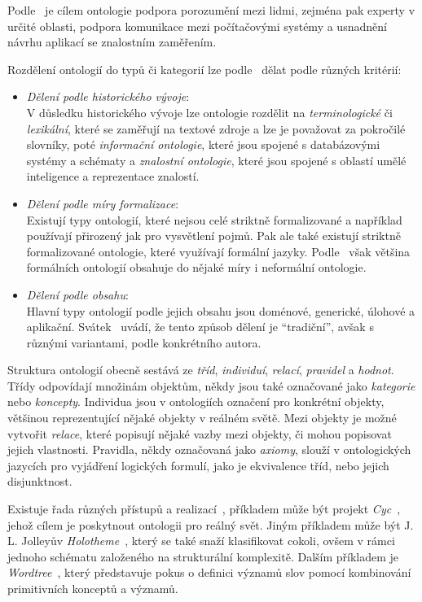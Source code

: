 Podle~\cite{onto_svatek} je cílem ontologie podpora porozumění mezi lidmi, zejména pak experty v určité oblasti,
podpora komunikace mezi počítačovými systémy a usnadnění návrhu aplikací se znalostním zaměřením.

Rozdělení ontologií do typů či kategorií lze podle~\cite{onto_svatek} dělat podle různých kritérií:
\begin{itemize}
	\item \emph{Dělení podle historického vývoje}:\\
	      V důsledku historického vývoje lze ontologie rozdělit na \emph{terminologické} či \emph{lexikální}, které se zaměřují
	      na textové zdroje a lze je považovat za pokročilé slovníky, poté \emph{informační ontologie}, které jsou spojené s databázovými systémy a schématy
	      a \emph{znalostní ontologie}, které jsou spojené s oblastí umělé inteligence a reprezentace znalostí.
	\item \emph{Dělení podle míry formalizace}:\\
	      Existují typy ontologií, které nejsou celé striktně formalizované a například používají přirozený jak pro vysvětlení pojmů.
	      Pak ale také existují striktně formalizované ontologie, které využívají formální jazyky.
	      Podle~\cite{onto_svatek} však většina formálních ontologií obsahuje do nějaké míry i neformální ontologie.
	\item \emph{Dělení podle obsahu}:\\
	      Hlavní typy ontologií podle jejich obsahu jsou doménové, generické, úlohové a aplikační.
	      Svátek~\cite{onto_svatek} uvádí, že tento způsob dělení je \enquote{tradiční}, avšak s různými variantami, podle konkrétního autora.
\end{itemize}

Struktura ontologií obecně sestává ze \emph{tříd}, \emph{individuí}, \emph{relací}, \emph{pravidel} a \emph{hodnot}.
Třídy odpovídají množinám objektům, někdy jsou také označované jako \emph{kategorie} nebo \emph{koncepty}.
Individua jsou v ontologiích označení pro konkrétní objekty, většinou reprezentující nějaké objekty v reálném světě.
Mezi objekty je možné vytvořit \emph{relace}, které popisují nějaké vazby mezi objekty, či mohou popisovat jejich vlastnosti.
Pravidla, někdy označovaná jako \emph{axiomy}, slouží v ontologických jazycích pro vyjádření logických formulí, jako je ekvivalence tříd, nebo jejich disjunktnost.~\cite{onto_svatek}

Existuje řada různých přístupů a realizací~\cite{semantic-nets-LEHMANN19921}, příkladem může být projekt \emph{Cyc}~\cite{cyc}, jehož cílem je poskytnout ontologii pro reálný svět.
Jiným příkladem může být J. L. Jolleyův \emph{Holotheme}~\cite{jolley1971holotheme}, který se také snaží klasifikovat cokoli,
ovšem v rámci jednoho schématu založeného na strukturální komplexitě.
Dalším příkladem je \emph{Wordtree}~\cite{burger1984wordtree}, který představuje pokus o definici významů slov pomocí kombinování primitivních konceptů a významů.

